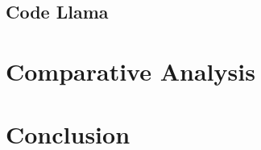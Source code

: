 \documentclass[11pt,a4paper]{article}
\begin{document}

\subsection{Code Llama}
\label{sec:codellama}


\section{Comparative Analysis}
\label{sec:comparison}




\section{Conclusion}
\label{sec:conclusion}



\end{document}
